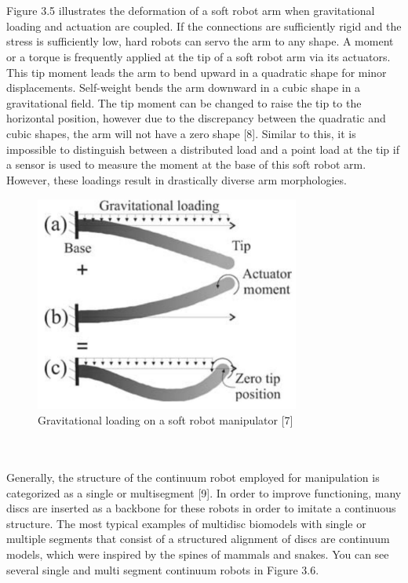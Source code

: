 \documentclass[12pt,twoside,a4]{mwbk}
\begin{document}
\\ \\
Figure 3.5 illustrates the deformation of a soft robot arm when gravitational loading and actuation are coupled. If the connections are sufficiently rigid and the stress is sufficiently low, hard robots can servo the arm to any shape. A moment or a torque is frequently applied at the tip of a soft robot arm via its actuators. This tip moment leads the arm to bend upward in a quadratic shape for minor displacements. Self-weight bends the arm downward in a cubic shape in a gravitational field. The tip moment can be changed to raise the tip to the horizontal position, however due to the discrepancy between the quadratic and cubic shapes, the arm will not have a zero shape [8]. Similar to this, it is impossible to distinguish between a distributed load and a point load at the tip if a sensor is used to measure the moment at the base of this soft robot arm. However, these loadings result in drastically diverse arm morphologies.
\begin{figure}[h]
    \centering
    \includegraphics[width=8.7cm, height=7.1cm]{grav.JPG}
    \caption{Gravitational loading on a soft robot manipulator [7]}
\end{figure}
\\ \\ 
Generally, the structure of the continuum robot employed for manipulation is categorized as a single or multisegment [9]. In order to improve functioning, many discs are inserted as a backbone for these robots in order to imitate a continuous structure. The most typical examples of multidisc biomodels with single or multiple segments that consist of a structured alignment of discs are continuum models, which were inspired by the spines of mammals and snakes. You can see several single and multi segment continuum robots in Figure 3.6.
\newpage
\end{document}
